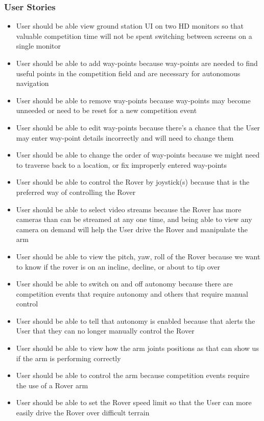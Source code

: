 \documentclass[onecolumn, draftclsnofoot, 10pt, compsoc]{IEEEtran}
\begin{document}
\subsubsection{User Stories}
\begin{itemize}
\item User should be able view ground station UI on two HD monitors so that valuable competition time will not be spent switching between screens on a single monitor
\item User should be able to add way-points because way-points are needed to find useful points in the competition field and are necessary for autonomous navigation
\item User should be able to remove way-points because way-points may become unneeded or need to be reset for a new competition event
\item User should be able to edit way-points because there's a chance that the User may enter way-point details incorrectly and will need to change them
\item User should be able to change the order of way-points because we might need to traverse back to a location, or fix improperly entered way-points
\item User should be able to control the Rover by joystick(s) because that is the preferred way of controlling the Rover  
\item User should be able to select video streams because the Rover has more cameras than can be streamed at any one time, and being able to view any camera on demand will help the User drive the Rover and manipulate the arm
\item User should be able to view the pitch, yaw, roll of the Rover because we want to know if the rover is on an incline, decline, or about to tip over
\item User should be able to switch on and off autonomy because there are competition events that require autonomy and others that require manual control
\item User should be able to tell that autonomy is enabled because that alerts the User that they can no longer manually control the Rover
\item User should be able to view how the arm joints positions as that can show us if the arm is performing correctly
\item User should be able to control the arm because competition events require the use of a Rover arm
\item User should be able to set the Rover speed limit so that the User can more easily drive the Rover over difficult terrain

\end{itemize}
\end{document}
